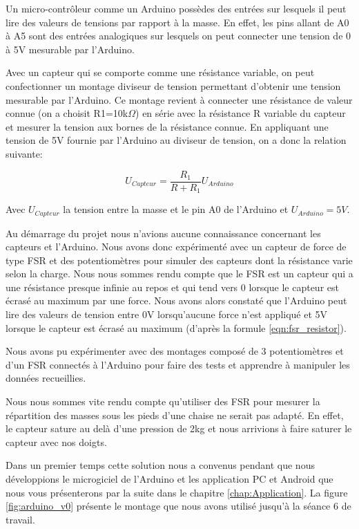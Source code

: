 \documentclass{polytech/polytech}
\begin{document}
Un micro-contrôleur comme un Arduino possèdes des entrées sur lesquels il peut lire des valeurs de tensions par rapport à la masse. En effet, les pins allant de A0 à A5 sont des entrées analogiques sur lesquels on peut connecter une tension de 0 à 5V mesurable par l'Arduino. 

Avec un capteur qui se comporte comme une résistance variable, on peut confectionner un montage diviseur de tension permettant d'obtenir une tension mesurable par l'Arduino. Ce montage revient à connecter une résistance de valeur connue (on a choisit R1=10k$\Omega$) en série avec la résistance R variable du capteur et mesurer la tension aux bornes de la résistance connue.  En appliquant une tension de 5V fournie par l'Arduino au diviseur de tension, on a donc la relation suivante:

\begin{equation}
\label{eqn:fsr_resistor}
U_{Capteur}= \frac{R_1}{ R + R_1} U_{Arduino} 
\end{equation}
 
 Avec $U_{Capteur}$ la tension entre la masse et le pin A0 de l'Arduino et $U_{Arduino}=5V$.
 
Au démarrage du projet nous n'avions aucune connaissance concernant les capteurs et l'Arduino. Nous avons donc expérimenté avec un capteur de force de type FSR et des potentiomètres pour simuler des capteurs dont la résistance varie selon la charge. Nous nous sommes rendu compte que le FSR est un capteur qui a une résistance presque infinie au repos et qui tend vers 0 lorsque le capteur est écrasé au maximum par une force. Nous avons alors constaté que l'Arduino peut lire des valeurs de tension entre 0V lorsqu'aucune force n'est appliqué et 5V lorsque le capteur est écrasé au maximum (d'après la formule \eqref{eqn:fsr_resistor}).

Nous avons pu expérimenter avec des montages composé de 3 potentiomètres et d'un FSR connectés à l'Arduino pour faire des tests et apprendre à manipuler les données recueillies.

Nous nous sommes vite rendu compte qu'utiliser des FSR pour mesurer la répartition des masses sous les pieds d'une chaise ne serait pas adapté. En effet, le capteur sature au delà d'une pression de 2kg et nous arrivions à faire saturer le capteur avec nos doigts.

Dans un premier temps cette solution nous a convenus pendant que nous développions le microgiciel de l'Arduino et les application PC et Android que nous vous présenterons par la suite dans le chapitre \ref{chap:Application}. La figure \ref{fig:arduino_v0} présente le montage que nous avons utilisé jusqu'à la séance 6 de travail.
\end{document}
